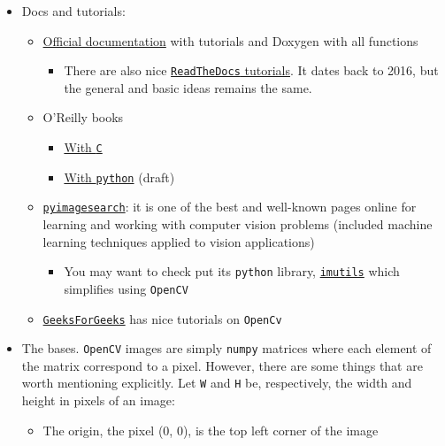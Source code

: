 \documentclass[a4paper,12pt,%
              final%
              ]{article}
\begin{document}
\begin{itemize}
  \item Docs and tutorials:
    \begin{itemize}
      \item \href{https://docs.opencv.org/3.4/index.html}{Official documentation} with tutorials and Doxygen with all functions
        \begin{itemize}
          \item There are also nice \href{https://opencv24-python-tutorials.readthedocs.io/en/latest/index.html}{\texttt{ReadTheDocs} tutorials}. It dates back to 2016, but the general and basic ideas remains the same.
        \end{itemize}
      \item O'Reilly books
        \begin{itemize}
          \item \href{https://www.bogotobogo.com/cplusplus/files/OReilly%20Learning%20OpenCV.pdf}{With \texttt{C}}
            \item \href{http://programmingcomputervision.com/downloads/ProgrammingComputerVision_CCdraft.pdf}{With \texttt{python}} (draft)
        \end{itemize}
      \item \href{https://www.pyimagesearch.com/}{\texttt{pyimagesearch}}: it is one of the best and well-known pages online for learning and working with computer vision problems (included machine learning techniques applied to vision applications)
        \begin{itemize}
          \item You may want to check put its \texttt{python} library, \href{https://github.com/jrosebr1/imutils}{\texttt{imutils}} which simplifies using \texttt{OpenCV}
        \end{itemize}
      \item \href{https://www.geeksforgeeks.org/}{\texttt{GeeksForGeeks}} has nice tutorials on \texttt{OpenCv}
    \end{itemize}
  \item The bases. \texttt{OpenCV} images are simply \texttt{numpy} matrices where each element of the matrix correspond to a pixel. However, there are some things that are worth mentioning explicitly. Let \texttt{W} and \texttt{H} be, respectively, the width and height in pixels of an image:
    \begin{itemize}
      \item The origin, the pixel (0, 0), is the top left corner of the image

\end{itemize}
\end{itemize}
\end{document}
